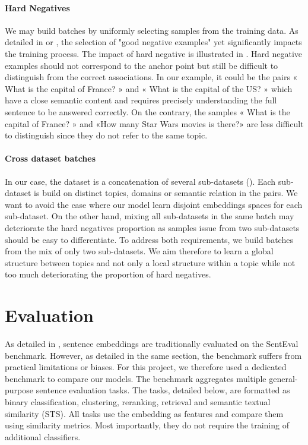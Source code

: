 \paragraph{Hard Negatives}  We may build batches by uniformly selecting samples from the training data. As detailed in \textcite{robinson_21} or \textcite{qu_21}, the selection of "good negative examples" yet significantly impacts the training process. The impact of hard negative is illustrated in .
Hard negative examples should not correspond to the anchor point but still be difficult to distinguish from the correct associations. 
In our example, it could be the pairs « What is the capital of France? » and « What is the capital of the US? » which have a close semantic content and requires precisely understanding the full sentence to be answered correctly. On the contrary, the samples « What is the capital of France? » and «How many Star Wars movies is there?» are less difficult to distinguish since they do not refer to the same topic.

\paragraph{Cross dataset batches} In our case, the dataset is a concatenation of several sub-datasets (). Each sub-dataset is build on distinct topics, domains or semantic relation in the pairs. We want to avoid the case where our model learn disjoint embeddings spaces for each sub-dataset. On the other hand, mixing all sub-datasets in the same batch may deteriorate the hard negatives proportion as samples issue from two sub-datasets should be easy to differentiate. To address both requirements, we build batches from the mix of only two sub-datasets. We aim therefore to learn a global structure between topics and not only a local structure within a topic while not too much deteriorating the proportion of hard negatives.

\section{Evaluation}

As detailed in , sentence embeddings are traditionally evaluated on the SentEval benchmark. However, as detailed in the same section, the benchmark suffers from practical limitations or biases. For this project, we therefore used a dedicated benchmark to compare our models. The benchmark aggregates multiple general-purpose sentence evaluation tasks. The tasks, detailed below, are formatted as binary classification, clustering, reranking, retrieval and semantic textual similarity (STS). All tasks use the embedding as features and compare them using similarity metrics. Most importantly, they do not require the training of additional classifiers.

